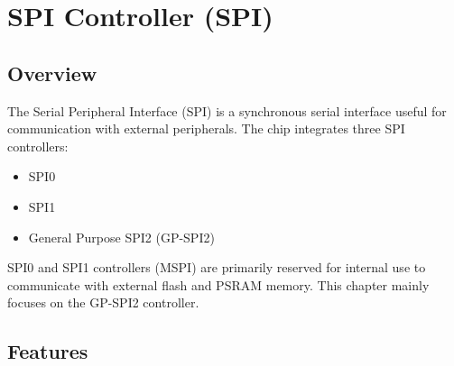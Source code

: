 \documentclass[main\_\_EN.tex]{subfiles}
\begin{document}

\ifglobal
\else
    \listoftodos
    {\let\clearpage\relax \listofdonetodos}
    \tableofcontents
\fi



\hypertarget{spi}{}
\chapter{SPI Controller (SPI)}
\label{mod:spi}

\section{Overview}

The Serial Peripheral Interface (SPI) is a synchronous serial interface useful for communication with external peripherals. 
The \chipname{} chip integrates three SPI controllers: 
\begin{itemize}
  \item SPI0
  \item SPI1
  \item General Purpose SPI2 (GP-SPI2)
\end{itemize}

SPI0 and SPI1 controllers (MSPI) are primarily reserved for internal use to communicate with external flash and PSRAM memory. This chapter mainly focuses on the GP-SPI2 controller.



\section{Features}
\end{document}
